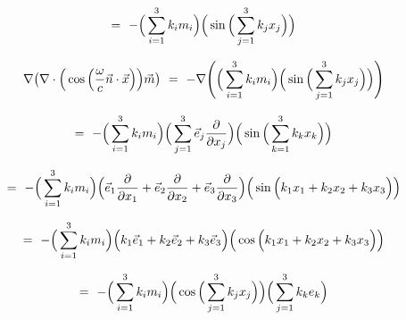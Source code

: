 \documentclass{article}
\begin{document}
\begin{equation} \label{eq:1}
= \hspace{0.125cm} - \Big( \sum_{i = 1}^{3} k_i m_i \Big) \Big( \sin \Big( \sum_{j = 1}^{3} k_j x_j \Big) \Big) \hspace{0.125cm} 
\end{equation}

\begin{equation} \label{eq:1}
\nabla \big( \nabla \cdot \Big( \cos \Big( \frac{\omega}{c} \vec{n} \cdot \vec{x} \Big) \Big) \vec{m} \big) \hspace{0.125cm} = \hspace{0.125cm} - \nabla \Bigg( \Big( \sum_{i = 1}^{3} k_i m_i \Big) \Big( \sin \Big( \sum_{j = 1}^{3} k_j x_j \Big) \Big) \Bigg) \hspace{0.125cm} 
\end{equation}

\begin{equation} \label{eq:1}
= \hspace{0.125cm} - \Big( \sum_{i = 1}^{3} k_i m_i \Big) \Big( \sum_{j = 1}^{3} \vec{e}_j  \frac{\partial}{\partial{x_j}} \Big) \Big( \sin \Big( \sum_{k = 1}^{3} k_k x_k \Big) \Big) \hspace{0.125cm} 
\end{equation}

\begin{equation} \label{eq:1}
= \hspace{0.125cm} - \Big( \sum_{i = 1}^{3} k_i m_i \Big) \Big( \vec{e}_1 \frac{\partial}{\partial{x_1}} + \vec{e}_2 \frac{\partial}{\partial{x_2}} + \vec{e}_3 \frac{\partial}{\partial{x_3}} \Big) \Big( \sin \Big( k_1 x_1 + k_2 x_2 + k_3 x_3 \Big) \Big) \hspace{0.125cm} 
\end{equation}

\begin{equation} \label{eq:1}
= \hspace{0.125cm} - \Big( \sum_{i = 1}^{3} k_i m_i \Big) \Big( k_1 \vec{e}_1 + k_2 \vec{e}_2 + k_3 \vec{e}_3 \Big) \Big( \cos \Big( k_1 x_1 + k_2 x_2 + k_3 x_3 \Big) \Big) \hspace{0.125cm} 
\end{equation}

\begin{equation} \label{eq:1}
= \hspace{0.125cm} - \Big( \sum_{i = 1}^{3} k_i m_i \Big) \Big( \cos \Big( \sum_{j = 1}^{3} k_j x_j \Big) \Big) \Big( \sum_{j = 1}^{3} k_k e_k \Big) \hspace{0.125cm} 
\end{equation}
\end{document}
